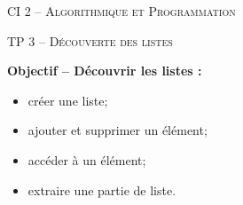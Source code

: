 \documentclass[11pt,oneside]{article}
\begin{document}
\pagestyle{fancy}
\renewcommand{\headrulewidth}{0pt}

\fancyhead{}

\fancyhead[C]{\rule{12cm}{.5pt}}


\renewcommand{\footrulewidth}{0.2pt}

\fancyfoot[C]{\footnotesize{\bfseries \thepage}}



\begin{center}
 \Large\textsc{CI 2 -- Algorithmique et Programmation}

\end{center}

\begin{center}
 \large\textsc{TP 3 -- Découverte des listes}
\end{center}
%
\begin{savoir}
\textbf{Objectif -- Découvrir les listes :}
\begin{itemize}
\item créer une liste;
\item ajouter et supprimer un élément;
\item accéder à un élément;
\item extraire une partie de liste.
\end{itemize}
\end{savoir}
% 
\end{document}
